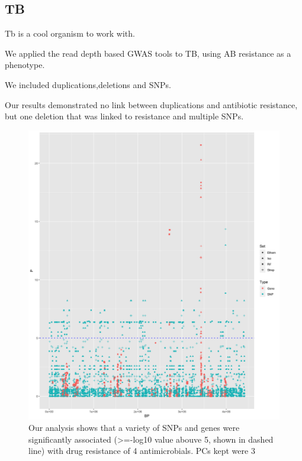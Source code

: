
\subsection{TB}

Tb is a cool organism to work with.

We applied the read depth based GWAS tools to TB, using AB resistance as a phenotype.  

We included duplications,deletions and SNPs.

Our results demonstrated no link between duplications and antibiotic resistance, but one deletion that was linked to resistance and multiple SNPs.





\begin{figure}[h!]
\centering
\includegraphics[width=\textwidth{}]{Chapter_3/Rplot21.png}
\caption{Our analysis shows that a variety of SNPs and genes were significantly associated (>=-log10 value abouve 5, shown in dashed line) with drug resistance of 4 antimicrobials. PCs kept were 3}
\label{fig:MDR_Man_PC3}
\end{figure}

